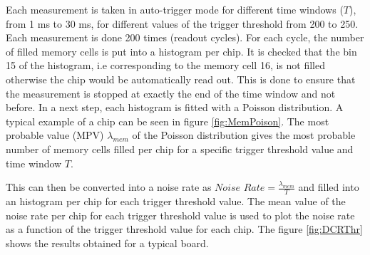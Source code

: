 Each measurement is taken in auto-trigger mode for different time windows ($T$), from 1 ms to 30 ms, for different values of the trigger threshold from 200 to 250. Each measurement is done 200 times (readout cycles). For each cycle, the number of filled memory cells is put into a histogram per chip. It is checked that the bin 15 of the histogram, i.e corresponding to the memory cell 16, is not filled otherwise the chip would be automatically read out. This is done to ensure that the measurement is stopped at exactly the end of the time window and not before. In a next step, each histogram is fitted with a Poisson distribution. A typical example of a chip can be seen in figure \ref{fig:MemPoison}. The most probable value (MPV) $\lambda_{mem}$ of the Poisson distribution gives the most probable number of memory cells filled per chip for a specific trigger threshold value and time window $T$.

This can then be converted into a noise rate as $\textit{Noise Rate} = \frac{\lambda_{mem}}{T}$ and filled into an histogram per chip for each trigger threshold value. The mean value of the noise rate per chip for each trigger threshold value is used to plot the noise rate as a function of the trigger threshold value for each chip. The figure \ref{fig:DCRThr} shows the results obtained for a typical board.

